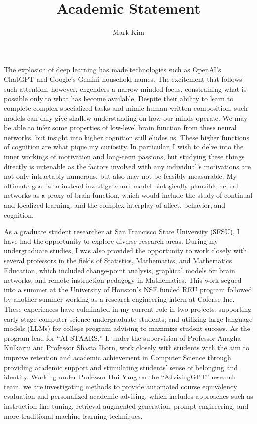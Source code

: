 \documentclass[12pt]{article}
\author{Mark Kim}
\title{Academic Statement}
\begin{document}
\maketitle
The explosion of deep learning has made technologies such as OpenAI's ChatGPT and Google's Gemini household names.  The excitement that
follows such attention, however, engenders a narrow-minded focus, constraining what is possible only to what has become available.  Despite
their ability to learn to complete complex specialized tasks and mimic human written composition, such models can only give shallow
understanding on how our minds  operate. We may be able to infer some properties of low-level brain function from these neural networks, but
insight into higher cognition still eludes us.  These higher functions of cognition are what pique my curiosity.  In particular, I wish to
delve into the inner workings of motivation and long-term passions, but studying these things directly is untenable as the factors involved
with any individual's motivations are not only intractably numerous, but also may not be feasibly measurable.  My ultimate goal is to
instead investigate and model biologically plausible neural networks as a proxy of brain function, which would include the study of
continual and localized learning, and the complex interplay of affect, behavior, and cognition.

As a graduate student researcher at San Francisco State University (SFSU), I have had the opportunity to explore diverse research areas.
During my undergraduate studies, I was also provided the opportunity to work closely with several professors in the fields of Statistics,
Mathematics, and Mathematics Education, which included change-point analysis, graphical models for brain networks, and remote instruction
pedagogy in Mathematics.  This work segued into a summer at the University of Houston's NSF funded REU program followed by another summer
working as a research engineering intern at Cofense Inc.  These experiences have culminated in my current role in two projects: supporting
early stage computer science undergraduate students; and utilizing large language models (LLMs) for college program advising to maximize
student success.  As the program lead for ``AI-STAARS,'' I, under the supervision of Professor Anagha Kulkarni and Professor Shasta Ihorn,
work closely with students with the aim to improve retention and academic achievement in Computer Science through providing academic support
and stimulating students' sense of belonging and identity.  Working under Professor Hui Yang on the ``AdvisingGPT'' research team, we are
investigating methods to provide automated course equivalency evaluation and personalized academic advising, which includes approaches such
as instruction fine-tuning, retrieval-augmented generation, prompt engineering, and more traditional machine learning techniques.
\end{document}
